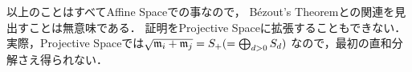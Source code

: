 \documentclass[a4paper]{jsarticle}
\begin{document}
以上のことはすべてAffine Spaceでの事なので，
B\'ezout's Theoremとの関連を見出すことは無意味である．
証明をProjective Spaceに拡張することもできない．
実際，Projective Spaceでは$\sqrt{\mathfrak{m}_i+\mathfrak{m}_j}=S_+ (=\bigoplus_{d>0} S_d)$
なので，最初の直和分解さえ得られない．


\end{document}
